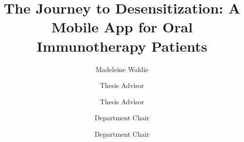 \documentclass{scu-thesis}
\author{Madeleine Waldie}
\title{The Journey to Desensitization: A Mobile App for Oral Immunotherapy Patients}
\begin{document}
\frontmatter
\signature{Thesis Advisor}
\signature{Thesis Advisor}
\signature{Department Chair}
\signature{Department Chair}

\maketitle


\tableofcontents
\listoffigures

\mainmatter











\backmatter
\end{document}
